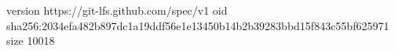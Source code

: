 version https://git-lfs.github.com/spec/v1
oid sha256:2034efa482b897dc1a19ddf56e1e13450b14b2b39283bbd15f843c55bf625971
size 10018
